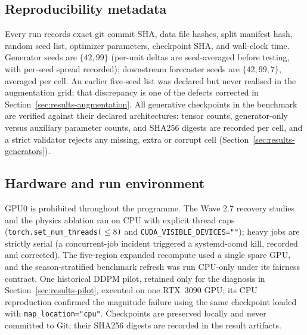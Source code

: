 \subsection{Reproducibility metadata}
Every run records exact git commit SHA, data file hashes, split manifest hash,
random seed list, optimizer parameters, checkpoint SHA, and wall-clock time.
Generator seeds are $\{42, 99\}$ (per-unit deltas are seed-averaged before
testing, with per-seed spread recorded); downstream forecaster seeds are
$\{42, 99, 7\}$, averaged per cell. An earlier five-seed list was declared
but never realised in the augmentation grid; that discrepancy is one of the
defects corrected in Section~\ref{sec:results-augmentation}. All generative
checkpoints in the benchmark are verified against their declared
architectures: tensor counts, generator-only versus auxiliary parameter
counts, and SHA256 digests are recorded per cell, and a strict validator
rejects any missing, extra or corrupt cell
(Section~\ref{sec:results-generators}).

\subsection{Hardware and run environment}
GPU0 is prohibited throughout the programme. The Wave 2.7 recovery studies and
the physics ablation ran on CPU with explicit thread caps
(\texttt{torch.set\_num\_threads($\le 8$)} and
\texttt{CUDA\_VISIBLE\_DEVICES=""}); heavy jobs are strictly serial (a
concurrent-job incident triggered a systemd-oomd kill, recorded and
corrected). The five-region expanded recompute used a single spare GPU, and the
season-stratified benchmark refresh
was run CPU-only under its fairness contract. One historical DDPM pilot,
retained only for the diagnosis in Section~\ref{sec:results-pilot}, executed
on one RTX~3090 GPU; its CPU reproduction confirmed the
magnitude failure using the same checkpoint loaded with
\texttt{map\_location="cpu"}. Checkpoints are preserved locally and never
committed to Git; their SHA256 digests are recorded in the result artifacts.
